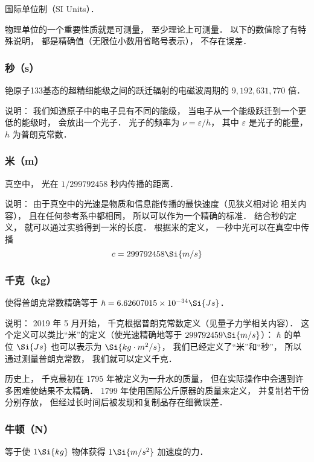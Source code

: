
国际单位制（SI Units）．

物理单位的一个重要性质就是可测量， 至少理论上可测量． 以下的数值除了有特殊说明， 都是精确值（无限位小数用省略号表示）， 不存在误差．

\subsubsection{秒（s）}
铯原子133基态的超精细能级之间的跃迁辐射的电磁波周期的 $9, 192, 631, 770$ 倍． 

说明： 我们知道原子中的电子具有不同的能级， 当电子从一个能级跃迁到一个更低的能级时， 会放出一个光子． 光子的频率为 $\nu  = \varepsilon /h$，   其中 $\varepsilon $ 是光子的能量， $h$ 为普朗克常数．

\subsubsection{米（m）}
真空中， 光在 $1/299792458$ 秒内传播的距离．

说明： 由于真空中的光速是物质和信息能传播的最快速度（见狭义相对论 相关内容）， 且在任何参考系中都相同， 所以可以作为一个精确的标准． 结合秒的定义， 就可以通过实验得到一米的长度． 根据米的定义， 一秒中光可以在真空中传播
\begin{equation}
c = 299792458 \Si{m/s}
\end{equation}

\subsubsection{千克（kg）}
使得普朗克常数精确等于 $\hbar = 6.62607015\times10^{-34}\Si{Js}$．

说明： 2019 年 5 月开始， 千克根据普朗克常数定义（见量子力学相关内容）． 这个定义可以类比“米”的定义（使光速精确地等于 $299792459\Si{m/s}$）： $\hbar$ 的单位 $\Si{Js}$ 也可以表示为 $\Si{kg\cdot m^2/s}$， 我们已经定义了“米”和“秒”， 所以通过测量普朗克常数， 我们就可以定义千克．

历史上， 千克最初在 1795 年被定义为一升水的质量， 但在实际操作中会遇到许多困难使结果不太精确． 1799 年使用国际公斤原器的质量来定义， 并复制若干份分别存放， 但经过长时间后被发现和复制品存在细微误差．

\subsubsection{牛顿（N）}
等于使 $1\Si{kg}$ 物体获得 $1\Si{m/s^2}$ 加速度的力．

